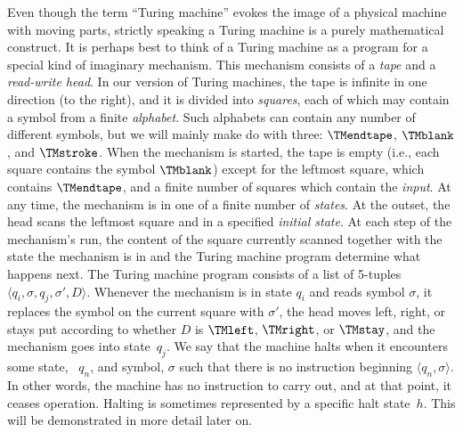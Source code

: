 \documentclass[../../../include/open-logic-section]{subfiles}
\begin{document}
\begin{explain}
 Even though the term ``Turing machine'' evokes the image of
a physical machine with moving parts, strictly speaking a Turing machine is
a purely mathematical construct. It is perhaps best to think of a Turing
machine as a program for a special kind of imaginary mechanism. This
mechanism consists of a \emph{tape} and a \emph{read-write head}. In our
version of Turing machines, the tape is infinite in one direction (to the
right), and it is divided into \emph{squares}, each of which may contain a
symbol from a finite \emph{alphabet}. Such alphabets can contain any number
of different symbols, but we will mainly make do with three: $\TMendtape$,
$\TMblank$, and $\TMstroke$. When the mechanism is started, the tape is
empty (i.e., each square contains the symbol $\TMblank$) except for the
leftmost square, which contains $\TMendtape$, and a finite number of
squares which contain the \emph{input}. At any time, the mechanism is in
one of a finite number of \emph{states}. At the outset, the head scans the
leftmost square and in a specified \emph{initial state}. At each step of
the mechanism's run, the content of the square currently scanned together
with the state the mechanism is in and the Turing machine program determine
what happens next. The Turing machine program consists of a list of
5-tuples $\langle q_i, \sigma, q_j, \sigma', D\rangle$. Whenever the
mechanism is in state $q_i$ and reads symbol $\sigma$, it replaces the
symbol on the current square with $\sigma'$, the head moves left, right, or
stays put according to whether $D$ is $\TMleft$, $\TMright$, or $\TMstay$,
and the mechanism goes into state~$q_j$. We say that the machine halts when
it encounters some state, ~$q_n$, and symbol, $\sigma$ such that there is
no instruction beginning $\langle q_n, \sigma\rangle$. In other words, the
machine has no instruction to carry out, and at that point, it ceases
operation. Halting is sometimes represented by a specific halt state~$h$.
This will be demonstrated in more detail later on.
 \end{explain}
\end{document}
